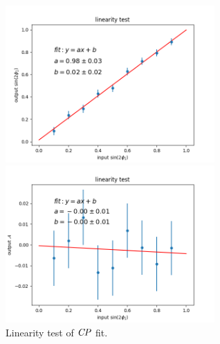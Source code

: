\begin{figure}[H]
	\begin{minipage}{0.5\linewidth}
		\includegraphics[height=6cm]{figures/S-test-line}
	\end{minipage}
	\begin{minipage}{0.5\linewidth}
		\includegraphics[height=6cm]{figures/A-test-line}
	\end{minipage}
	\caption{Linearity test of $\it{CP}$ fit.}
	\label{fig:cpfit_line_S}
\end{figure}

